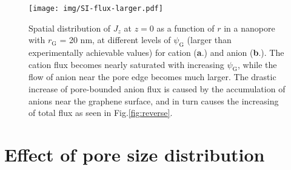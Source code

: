 \documentclass[journal=langd5,email=true, hyperref=true, keywords=false]{achemso}
\newcommand{\Fig}{Fig.}
\begin{document}
\begin{figure}[htbp]
  \centering
  \texttt{[image: img/SI-flux-larger.pdf]}
  \caption{Spatial distribution of $J_{z}$ at $z = 0$ as a function
    of $r$ in a nanopore with $r_{\mathrm{G}}$ = 20 nm, at different
    levels of $\psi_{\mathrm{G}}$ (larger than experimentally
    achievable values) for cation (\textbf{a}.) and anion
    (\textbf{b}.). The cation flux becomes nearly saturated with
    increasing $\psi_{\mathrm{G}}$, while the flow of anion near the
    pore edge becomes much larger. The drastic increase of
    pore-bounded anion flux is caused by the accumulation of anions
    near the graphene surface, and in turn causes the increasing of
    total flux as seen in \Fig \ref{fig:reverse}.}
  \label{fig:large-V}
\end{figure}
\clearpage{}

\section{Effect of pore size distribution}
\label{sec:pore-dist}
\end{document}

